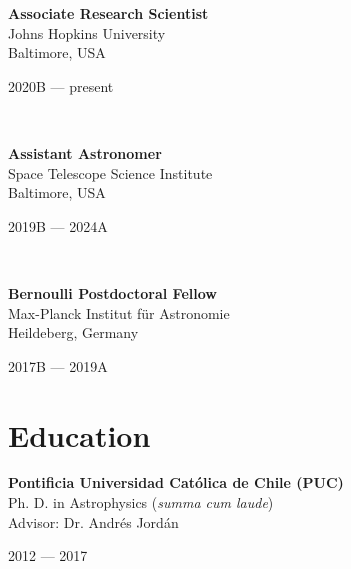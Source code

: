 \documentclass[12pt, a4paper]{article} %
\begin{document}
\begin{minipage}[t]{0.6\textwidth}
\begin{flushleft}%
  \setlength{\leftskip}{0.2cm}%
\textbf{Associate Research Scientist}\\
Johns Hopkins University\\
Baltimore, USA
 
\end{flushleft}
\end{minipage}
\begin{minipage}[t]{0.4\textwidth}
\hfill 2020B --- present 
\end{minipage}\\

\begin{minipage}[t]{0.6\textwidth}
\begin{flushleft}%
  \setlength{\leftskip}{0.2cm}%
\textbf{Assistant Astronomer}\\
Space Telescope Science Institute\\
Baltimore, USA
 
\end{flushleft}
\end{minipage}
\begin{minipage}[t]{0.4\textwidth}
\hfill 2019B --- 2024A 
\end{minipage}\\

\begin{minipage}[t]{0.6\textwidth}
\begin{flushleft}%
  \setlength{\leftskip}{0.2cm}%
\textbf{Bernoulli Postdoctoral Fellow}\\
Max-Planck Institut f\"ur Astronomie\\
Heildeberg, Germany
 
\end{flushleft}
\end{minipage}
\begin{minipage}[t]{0.4\textwidth}
\hfill 2017B --- 2019A 
\end{minipage}

\section*{Education}


\begin{minipage}[t]{0.6\textwidth}
\begin{flushleft}%
  \setlength{\leftskip}{0.2cm}%
\textbf{Pontificia Universidad Cat\'olica de Chile (PUC)}\\
Ph. D. in Astrophysics (\textit{summa cum laude})\\
Advisor: Dr. Andr\'es Jord\'an
 
\end{flushleft}
\end{minipage}
\begin{minipage}[t]{0.4\textwidth}
\hfill 2012 --- 2017 
\end{minipage}\\
\end{document}
